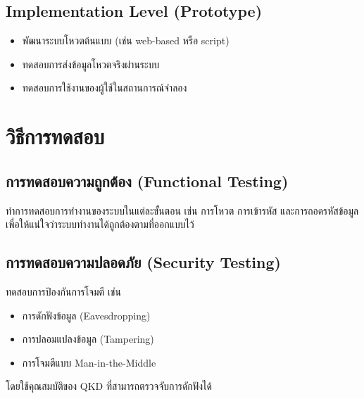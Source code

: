 \subsection{Implementation Level (Prototype)}

\begin{itemize}
    \item พัฒนาระบบโหวตต้นแบบ (เช่น web-based หรือ script)
    \item ทดสอบการส่งข้อมูลโหวตจริงผ่านระบบ
    \item ทดสอบการใช้งานของผู้ใช้ในสถานการณ์จำลอง
\end{itemize}

\section{วิธีการทดสอบ}

\subsection{การทดสอบความถูกต้อง (Functional Testing)}

ทำการทดสอบการทำงานของระบบในแต่ละขั้นตอน เช่น การโหวต การเข้ารหัส และการถอดรหัสข้อมูล เพื่อให้แน่ใจว่าระบบทำงานได้ถูกต้องตามที่ออกแบบไว้

\subsection{การทดสอบความปลอดภัย (Security Testing)}

ทดสอบการป้องกันการโจมตี เช่น

\begin{itemize}
    \item การดักฟังข้อมูล (Eavesdropping)
    \item การปลอมแปลงข้อมูล (Tampering)
    \item การโจมตีแบบ Man-in-the-Middle
\end{itemize}

โดยใช้คุณสมบัติของ QKD ที่สามารถตรวจจับการดักฟังได้